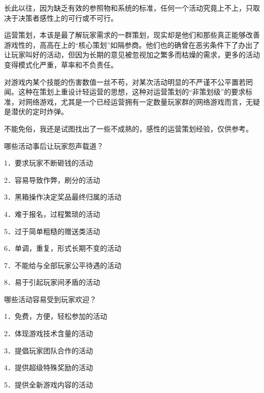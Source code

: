 \documentclass{article}
\begin{document}
长此以往，因为缺乏有效的参照物和系统的标准，任何一个活动究竟上不上，只取决于决策者感性上的可行或不可行。



运营策划，本该是最了解玩家需求的一群策划，现实却是他们和那些真正能够改善游戏性的，高高在上的“核心策划”如隔参商。他们也的确曾在恶劣条件下了办出了让玩家叫好的活动，但因为长期的意见被忽视加之繁多而枯燥的需求，更多的活动变得模式化严重，草率和不负责任。



对游戏内某个技能的伤害数值一丝不苟，对某次活动明显的不严谨不公平置若罔闻。这种在策划上重设计轻运营的思想，这种对运营策划的“非策划级”的要求标准，对网络游戏，尤其是一个已经运营拥有一定数量玩家群的网络游戏而言，无疑是潜伏的定时炸弹。



不能免俗，我还是试图找出了一些不成熟的，感性的运营策划经验，仅供参考。



哪些活动事后让玩家怨声载道？



1．要求玩家不断砸钱的活动



2．容易导致作弊，刷分的活动



3．黑箱操作决定奖品最终归属的活动



4．难于报名，过程繁琐的活动



5．过于简单粗糙的赠送类活动



6．单调，重复，形式长期不变的活动



7．不能给与全部玩家公平待遇的活动



8．易于引起玩家间矛盾的活动



哪些活动容易受到玩家欢迎？



1．免费，方便，轻松参加的活动



2．体现游戏技术含量的活动



3．提倡玩家团队合作的活动



4．提供超级特殊奖励的活动



5．提供全新游戏内容的活动
\end{document}
